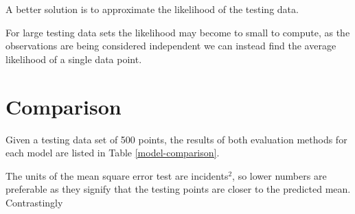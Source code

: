 \documentclass[a4paper,11pt]{report}
\begin{document}
A better solution is to approximate the likelihood of the testing data. 

For large testing data sets the likelihood may become to small to compute, as the observations are being considered independent we can instead find the average likelihood of a single data point.

\section{Comparison}

Given a testing data set of 500 points, the results of both evaluation methods for each model are listed in Table \ref{model-comparison}. \par

The units of the mean square error test are incidents\(^2\), so lower numbers are preferable as they signify that the testing points are closer to the predicted mean. Contrastingly 
\end{document}
